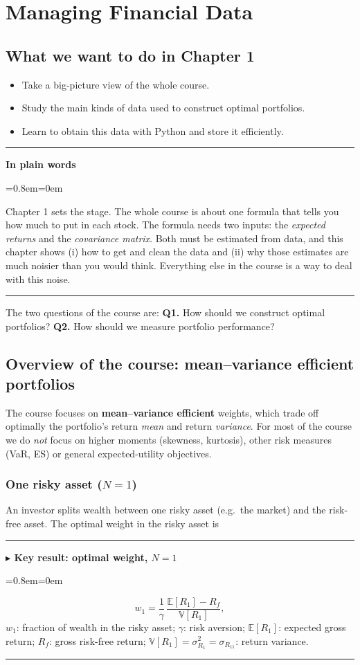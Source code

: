 \documentclass[11pt,a4paper]{report}
\newenvironment{notebox}[1]
  {\par\medskip\Needspace{6\baselineskip}\noindent\rule{\linewidth}{0.4pt}\par\nopagebreak
   \noindent\textbf{#1}\par\nopagebreak
   \begin{list}{}{\leftmargin=0.8em\rightmargin=0em\topsep=2pt}\item[]}
  {\end{list}\nopagebreak\noindent\rule{\linewidth}{0.4pt}\par\medskip}
\newenvironment{keybox}[1][]{\begin{notebox}{$\blacktriangleright$ Key result#1}}{\end{notebox}}
\newenvironment{plainbox}{\begin{notebox}{In plain words}}{\end{notebox}}
\newcommand{\E}{\mathbb{E}}
\newcommand{\V}{\mathbb{V}}
\newcommand{\Rf}{R_f}
\begin{document}
\chapter{Managing Financial Data}
\label{ch:1}

\section{What we want to do in Chapter 1}
\begin{itemize}
  \item Take a big-picture view of the whole course.
  \item Study the main kinds of data used to construct optimal portfolios.
  \item Learn to obtain this data with Python and store it efficiently.
\end{itemize}
\begin{plainbox}
Chapter 1 sets the stage. The whole course is about one formula that tells you
how much to put in each stock. The formula needs two inputs: the \emph{expected
returns} and the \emph{covariance matrix}. Both must be estimated from data, and
this chapter shows (i) how to get and clean the data and (ii) why those
estimates are much noisier than you would think. Everything else in the course is
a way to deal with this noise.
\end{plainbox}
The two questions of the course are:
\textbf{Q1.} How should we construct optimal portfolios?
\textbf{Q2.} How should we measure portfolio performance?

\section{Overview of the course: mean--variance efficient portfolios}

The course focuses on \textbf{mean--variance efficient} weights, which
trade off optimally the portfolio's return \emph{mean} and return
\emph{variance}. For most of the course we do \emph{not} focus on higher
moments (skewness, kurtosis), other risk measures (VaR, ES) or general
expected-utility objectives.

\subsection{One risky asset ($N=1$)}
An investor splits wealth between one risky asset (e.g.\ the market) and the
risk-free asset. The optimal weight in the risky asset is
\begin{keybox}[: optimal weight, $N=1$]
\[
  w_1 = \frac{1}{\gamma}\,\frac{\E[R_1]-\Rf}{\V[R_1]},
\]
$w_1$: fraction of wealth in the risky asset; $\gamma$: risk aversion;
$\E[R_1]$: expected gross return; $\Rf$: gross risk-free return;
$\V[R_1]=\sigma^2_{R_1}=\sigma_{R_{11}}$: return variance.
\end{keybox}
\end{document}
